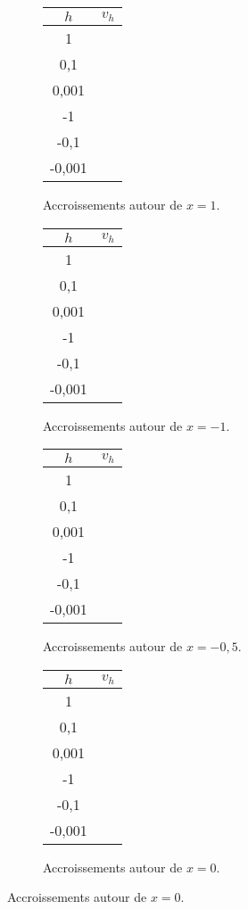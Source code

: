 \begin{figure}[h!]
	\centering
	\begin{subfigure}{0.2\textwidth}
	\begin{tabular}{|c|c|}\hline
		$h$ & $v_h$ \\ \hline
		1 & \hspace{1cm} \\ \hline
		0,1 & \\ \hline
		0,001 & \\ \hline
		-1 & \\ \hline
		-0,1 & \\ \hline
		-0,001 & \\ \hline
	\end{tabular}
	\caption{Accroissements autour de $x=1$.}
	\label{fig:1a}
	\end{subfigure}
	\hfill
	\begin{subfigure}{0.2\textwidth}
	\begin{tabular}{|c|c|}\hline
		$h$ & $v_h$ \\ \hline
		1 & \hspace{1cm} \\ \hline
		0,1 & \\ \hline
		0,001 & \\ \hline
		-1 & \\ \hline
		-0,1 & \\ \hline
		-0,001 & \\ \hline
	\end{tabular}
	\caption{Accroissements autour de $x=-1$.}
	\label{fig:1b}
	\end{subfigure}
	\hfill
	\begin{subfigure}{0.2\textwidth}
	\begin{tabular}{|c|c|}\hline
		$h$ & $v_h$ \\ \hline
		1 & \hspace{1cm} \\ \hline
		0,1 & \\ \hline
		0,001 & \\ \hline
		-1 & \\ \hline
		-0,1 & \\ \hline
		-0,001 & \\ \hline
	\end{tabular}
	\caption{Accroissements autour de $x=-0,5$.}
	\label{fig:1c}
	\end{subfigure}
	\hfill
	\begin{subfigure}{0.2\textwidth}
	\begin{tabular}{|c|c|}\hline
		$h$ & $v_h$ \\ \hline
		1 & \hspace{1cm} \\ \hline
		0,1 & \\ \hline
		0,001 & \\ \hline
		-1 & \\ \hline
		-0,1 & \\ \hline
		-0,001 & \\ \hline
	\end{tabular}
	\caption{Accroissements autour de $x=0$.}
	\label{fig:1d}
	\end{subfigure}
	

\end{figure}
